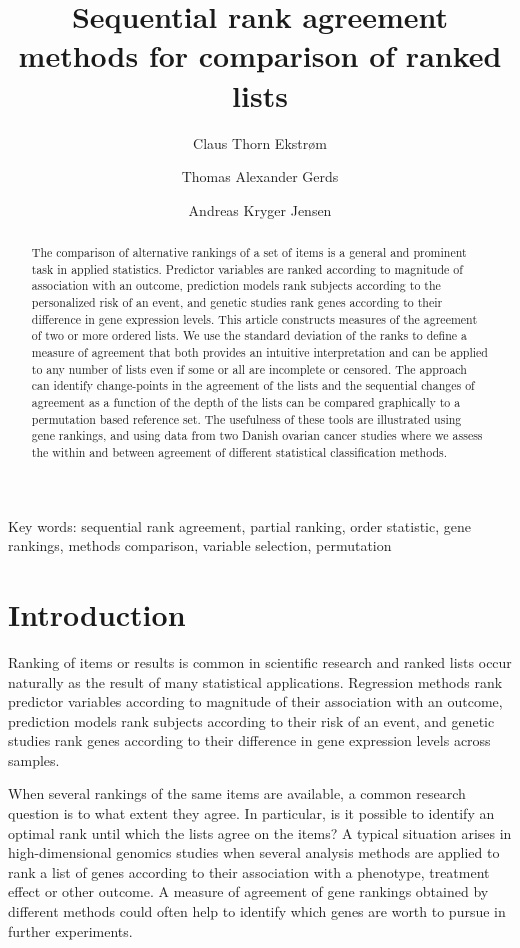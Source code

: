 \documentclass[12pt,a4paper]{article}
\title{Sequential rank agreement methods for comparison of ranked lists}
\author{Claus Thorn Ekstrøm}
\author{Thomas Alexander Gerds}
\author{Andreas Kryger Jensen}
\affil{Biostatistics, University of Copenhagen}
\theoremstyle{plain}
\begin{document}

\maketitle

\begin{abstract}
  The comparison of alternative rankings of a set of items is a
  general and prominent task in applied statistics. Predictor
  variables are ranked according to magnitude of association with an
  outcome, prediction models rank subjects according to the
  personalized risk of an event, and genetic studies rank genes
  according to their difference in gene expression levels. This
  article constructs measures of the agreement of two or more ordered
  lists. We use the standard deviation of the ranks to define a
  measure of agreement that both provides an intuitive interpretation
  and can be applied to any number of lists even if some or all are
  incomplete or censored. The approach can identify change-points in
  the agreement of the lists and the sequential changes of agreement
  as a function of the depth of the lists can be compared graphically
  to a permutation based reference set.  The usefulness of these tools
  are illustrated using gene rankings, and using data from two Danish
  ovarian cancer studies where we assess the within and between
  agreement of different statistical classification methods.
\end{abstract}

Key words: sequential rank agreement, partial ranking, order
statistic, gene rankings, methods comparison, variable selection,
permutation

\section{Introduction}

Ranking of items or results is common in scientific research and
ranked lists occur naturally as the result of many statistical
applications. Regression methods rank predictor variables according to
magnitude of their association with an outcome, prediction models rank
subjects according to their risk of an event, and genetic studies rank
genes according to their difference in gene expression levels across
samples.


When several rankings of the same items are available, a common
research question is to what extent they agree. In particular, is it
possible to identify an optimal rank until which the lists agree on
the items?  A typical situation arises in high-dimensional genomics
studies when several analysis methods are applied to rank a list of
genes according to their association with a phenotype, treatment
effect or other outcome. A measure of agreement of gene rankings
obtained by different methods could often help to identify which genes
are worth to pursue in further experiments.
\end{document}
